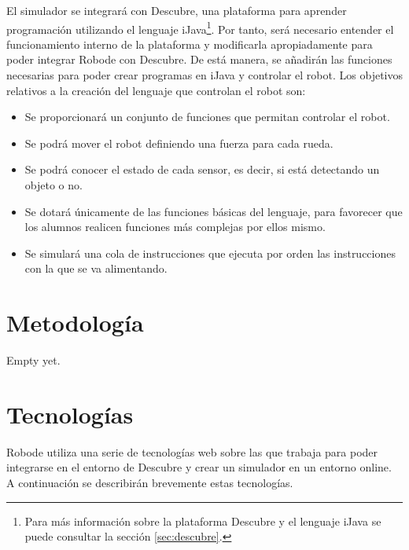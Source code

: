 El simulador se integrará con Descubre, una plataforma para aprender programación utilizando el lenguaje iJava\footnote{Para más información sobre la plataforma Descubre y el lenguaje iJava se puede consultar la sección \ref{sec:descubre}.}. Por tanto, será necesario entender el funcionamiento interno de la plataforma y modificarla apropiadamente para poder integrar Robode con Descubre. De está manera, se añadirán las funciones necesarias para poder crear programas en iJava y controlar el robot. Los objetivos relativos a la creación del lenguaje que controlan el robot son:

\begin{itemize}
	\item Se proporcionará un conjunto de funciones que permitan controlar el robot.
	\item Se podrá mover el robot definiendo una fuerza para cada rueda.
	\item Se podrá conocer el estado de cada sensor, es decir, si está detectando un objeto o no.
	\item Se dotará únicamente de las funciones básicas del lenguaje, para favorecer que los alumnos realicen funciones más complejas por ellos mismo.
	\item Se simulará una cola de instrucciones que ejecuta por orden las instrucciones con la que se va alimentando.
\end{itemize}


\section{{\color{green}Metodología}}
\label{sec:metodologia}


{\color{green}
Empty yet.
}


\section{Tecnologías}
\label{sec:tecnologias}


Robode utiliza una serie de tecnologías web sobre las que trabaja para poder integrarse en el entorno de Descubre y crear un simulador en un entorno online. A continuación se describirán brevemente estas tecnologías.

